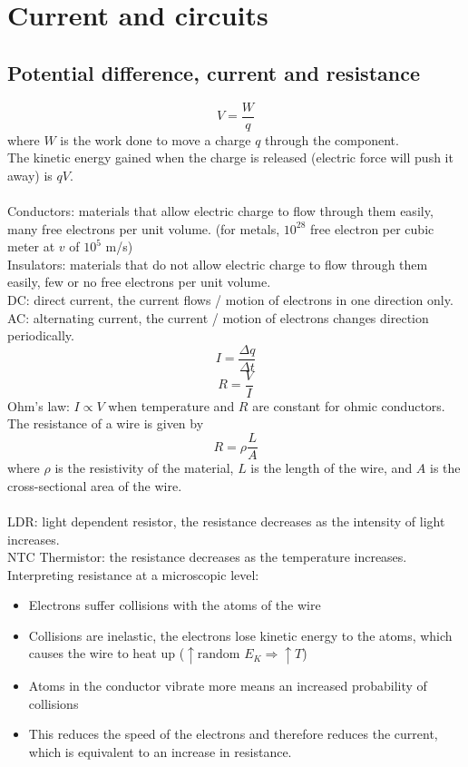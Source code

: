 \documentclass[a4paper,12pt]{article}
\begin{document}
\section{Current and circuits}
\subsection{Potential difference, current and resistance}
$$V=\dfrac{W}{q}$$
where $W$ is the work done to move a charge $q$ through the component.\\
The kinetic energy gained when the charge is released (electric force will push it away) is $qV$.\\\\
Conductors: materials that allow electric charge to flow through them easily, many free electrons per unit volume. (for metals, $10^28$ free electron per cubic meter at $v$ of $10^5$ m/s)\\
Insulators: materials that do not allow electric charge to flow through them easily, few or no free electrons per unit volume.\\
DC: direct current, the current flows / motion of electrons in one direction only.\\
AC: alternating current, the current / motion of electrons changes direction periodically.\\
$$I=\dfrac{\Delta q}{\Delta t}$$
$$R=\dfrac{V}{I}$$
Ohm's law: $I\propto V$ when temperature and $R$ are constant for ohmic conductors.\\
The resistance of a wire is given by
\[R=\rho\dfrac{L}{A}\]
where $\rho$ is the resistivity of the material, $L$ is the length of the wire, and $A$ is the cross-sectional area of the wire.\\\\
LDR: light dependent resistor, the resistance decreases as the intensity of light increases.\\
NTC Thermistor: the resistance decreases as the temperature increases.\\
Interpreting resistance at a microscopic level: 
\begin{itemize}
  \item Electrons suffer collisions with the atoms of the wire
  \item Collisions are inelastic, the electrons lose kinetic energy to the atoms, which causes the wire to heat up ($\uparrow \text{random }E_K \Rightarrow \uparrow T$)
  \item Atoms in the conductor vibrate more means an increased probability of collisions
  \item This reduces the speed of the electrons and therefore reduces the current, which is equivalent to an increase in resistance.
\end{itemize}
\end{document}
